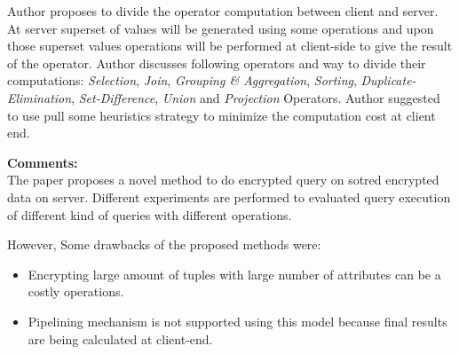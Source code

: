 \documentclass[a4paper,11pt, twoside]{article}
\begin{document}
Author proposes to divide the operator computation between client and server. At server superset of values will be generated using some operations and upon those superset values operations will be performed at client-side to give the result of the operator. Author discusses following operators and way to divide their computations: \emph{Selection}, \emph{Join}, \emph{Grouping \& Aggregation}, \emph{Sorting}, \emph{Duplicate-Elimination}, \emph{Set-Difference}, \emph{Union} and \emph{Projection} Operators. Author suggested to use pull some heuristics strategy to minimize the computation cost at client end. 

\textbf{Comments:}\\
The paper proposes a novel method to do encrypted query on sotred encrypted data on server. Different experiments are performed to evaluated query execution of different kind of queries with different operations. 

However, Some drawbacks of the proposed methods were:
\begin{itemize}
	\item Encrypting large amount of tuples with large number of attributes can be a costly operations. 	
	\item Pipelining mechanism is not supported using this model because final results are being calculated at client-end.
\end{itemize}
\end{document}
